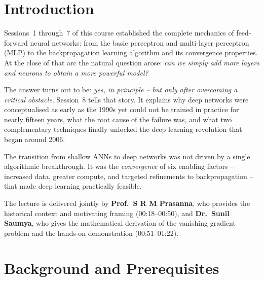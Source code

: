 \documentclass[12pt,a4paper]{article}
\begin{document}

\newpage

\section{Introduction}
\label{sec:introduction}

Sessions~1 through~7 of this course established the complete mechanics
of feed-forward neural networks: from the basic perceptron and
multi-layer perceptron (MLP) to the backpropagation learning algorithm
and its convergence properties.  At the close of that arc the natural
question arose: \emph{can we simply add more layers and neurons to
obtain a more powerful model?}

The answer turns out to be: \emph{yes, in principle -- but only after
overcoming a critical obstacle.}  Session~8 tells that story.  It
explains why deep networks were conceptualised as early as the 1990s
yet could not be trained in practice for nearly fifteen years, what the
root cause of the failure was, and what two complementary techniques
finally unlocked the deep learning revolution that began around 2006.

\begin{keyinsight}
The transition from shallow ANNs to deep networks was not driven by a
single algorithmic breakthrough.  It was the \emph{convergence} of six
enabling factors -- increased data, greater compute, and targeted
refinements to backpropagation -- that made deep learning practically
feasible.
\end{keyinsight}

The lecture is delivered jointly by \textbf{Prof.\ S R M Prasanna},
who provides the historical context and motivating framing
(00:18--00:50), and \textbf{Dr.\ Sunil Saumya}, who gives the
mathematical derivation of the vanishing gradient problem and the
hands-on demonstration (00:51--01:22).

\section{Background and Prerequisites}
\label{sec:background}
\end{document}
